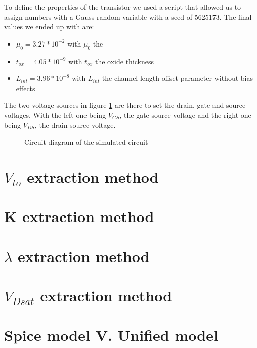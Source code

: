 To define the properties of the transistor we used a script %
that allowed us to assign numbers with a Gauss random variable with a seed of 5625173. The final values we ended up with are: 
\begin{itemize}
    \item $\mu_0 = 3.27 * 10^{-2}$ with $\mu_0$ the %
    \item $t_{ox} = 4.05 * 10^{-9}$ with $t_{ox}$ the oxide thickness
    \item $L_{int} = 3.96 * 10^{-8}$ with $L_{int}$ the channel length offset parameter without bias effects
\end{itemize}

The two voltage sources in figure \ref{fig:Sim_Circ} are there to set the drain, gate and source voltages. With the left one being $V_{GS}$, the gate source voltage and the right one being $V_{DS}$, the drain source voltage.\\

\begin{figure}[h!]
    \centering
        
    \caption{Circuit diagram of the simulated circuit}
    \label{fig:Sim_Circ}
\end{figure}

\section{$V_{to}$ extraction method}

\section{K extraction method}

\section{$\lambda$ extraction method}

\section{$V_{Dsat}$ extraction method}

\section{Spice model V. Unified model}